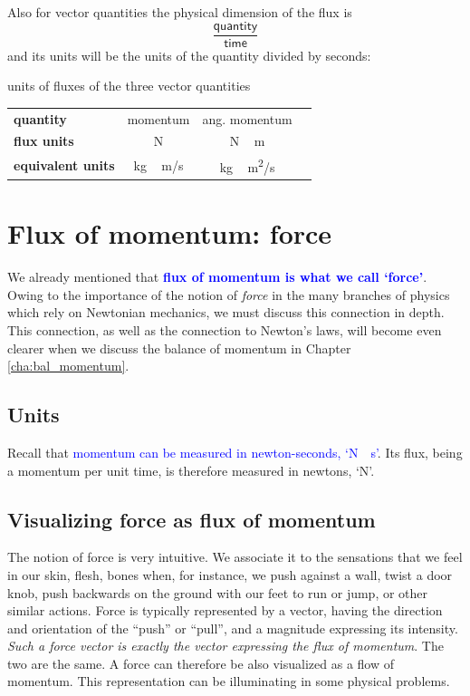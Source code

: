 \documentclass[a4paper,12pt,%
onecolumn,oneside,%
british%
]{memoir}
\renewcommand*{\|}[1][]{\nonscript\:#1\vert\nonscript\:\mathopen{}}
\newcommand*{\sect}{\S}%
\newcommand*{\chap}{Chapter}%
\renewcommand*{\autoref}[2]{\sidepar{\vspace{-1ex}\footnotesize{\color{blue}\faIcon{%
angle-right%
}\enspace\sect\,\ref{#1} page\,\pageref{#1}}}\textcolor{blue}{#2}}
\begin{document}
Also for vector quantities the physical dimension of the flux is
\begin{equation*}
  \frac{\textsf{quantity}}{\textsf{time}}
\end{equation*}
and its units will be the units of the quantity divided by seconds:
\begin{definition}{units of fluxes of the three vector quantities}
  \centering
  \begin{tabular*}{\linewidth}{@{\extracolsep{\fill}}lccc}
    \textbf{quantity}& momentum & ang. momentum
    \\[2\jot]
    \textbf{flux units}& \unit{N} & \unit{N\,m}
    \\[2\jot]
    \textbf{equivalent units}& \unit{kg\,m/s}  & \unit{kg\,m^2/s}
  \end{tabular*}
  \label{tab:fluxes_vector_units}
\end{definition}


\section{Flux of momentum: force}
\label{sec:force_is_flux}

We already mentioned that \autoref{sec:intro_momentum}{\textbf{flux of momentum is what we call \enquote*{force}}}. Owing to the importance of the notion of \emph{force} in the many branches of physics which rely on Newtonian mechanics, we must discuss this connection in depth. This connection, as well as the connection to Newton's laws, will become even clearer when we discuss the balance of momentum in \chap\,\ref{cha:bal_momentum}.

\subsection{Units}
\label{sec:units_momflux}

Recall that \autoref{sec:intro_momentum}{momentum can be measured in newton-seconds, \enquote*{\unit{N\cdot s}}}. Its flux, being a momentum per unit time, is therefore measured in newtons, \enquote*{\unit{N}}.

\subsection{Visualizing force as flux of momentum}
\label{sec:visualize_force}

The notion of force is very intuitive. We associate it to the sensations that we feel in our skin, flesh, bones when, for instance, we push against a wall, twist a door knob, push backwards on the ground with our feet to run or jump, or other similar actions. Force is typically represented by a vector, having the direction and orientation of the \enquote{push} or \enquote{pull}, and a magnitude expressing its intensity. \emph{Such a force vector is exactly the vector expressing the flux of momentum}. The two are the same. A force can therefore be also visualized as a flow of momentum. This representation can be illuminating in some physical problems.
\end{document}
